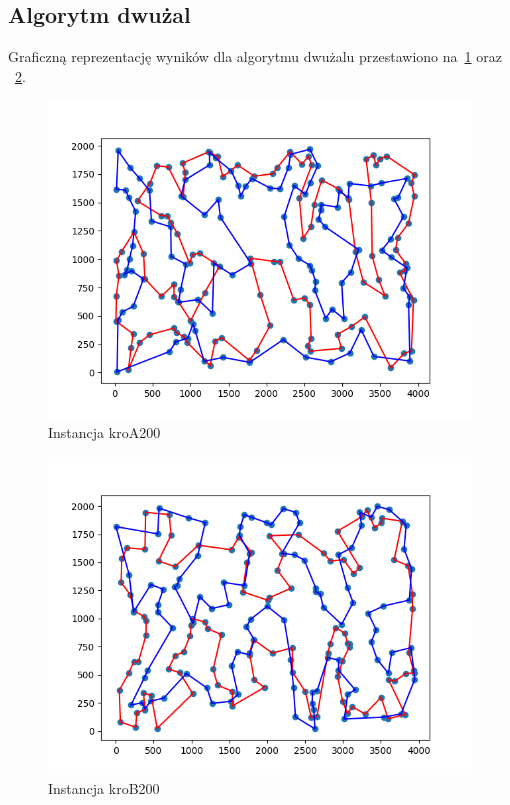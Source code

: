 \documentclass[11pt]{article}
\begin{document}
\subsection{Algorytm dwużal}\label{subsec:algorytm-dwużal}
Graficzną reprezentację wyników dla algorytmu dwużalu przestawiono na~\ref{fig:Two-regret-kroA} oraz ~\ref{fig:Two-regret-kroB}.

\begin{figure}[H]
    \centering
    \includegraphics{best_paths/two_regret_kroA200.tsp.png}
    \caption{Instancja kroA200}
    \label{fig:Two-regret-kroA}
\end{figure}
\begin{figure}[H]
    \centering
    \includegraphics{best_paths/two_regret_kroB200.tsp.png}
    \caption{Instancja kroB200}
    \label{fig:Two-regret-kroB}
\end{figure}
\end{document}
